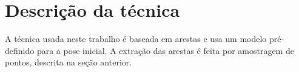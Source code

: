 \chapter{Descrição da técnica}

A técnica usada neste trabalho é baseada em arestas e usa um modelo pré-definido para a pose inicial. A extração das arestas é feita por amostragem de pontos, descrita na seção anterior.

